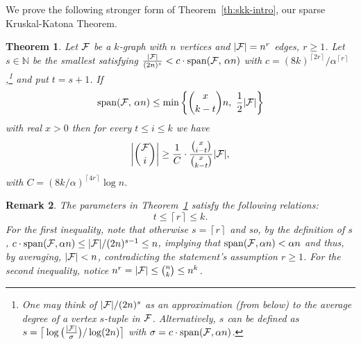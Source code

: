 \documentclass[11pt]{article}
\newtheorem{theo}{Theorem}[section]
\newtheorem{theo}{Theorem}[section]
\newtheorem{remark}[theo]{Remark}
\newcommand{\FF}{{\cal F}}
\newcommand{\ceil}[1]{\left\lceil #1 \right\rceil}
\renewcommand{\wp}{\mathrm{span}}
\renewcommand{\a}{\alpha}
\newcommand{\g}{\gamma}
\newcommand{\N}{\mathbb{N}}
\begin{document}
We prove the following stronger form of Theorem~\ref{th:skk-intro}, our sparse Kruskal-Katona Theorem.

\begin{theo}\label{th:skk}
	Let $\FF$ be a $k$-graph with $n$ vertices and $|\FF|=n^r$ edges, $r \ge 1$. Let $s \in \N$ be the smallest satisfying $\frac{|\FF|}{(2n)^s} < c \cdot \wp(\FF,\, \a n)$ with 
	$c=(8k)^{\ceil{2r}}/\a^{\ceil{r}}$
	,\footnote{One may think of $|\FF|/(2n)^s$ as an approximation (from below) to the average degree of a vertex $s$-tuple in $\FF$. Alternatively, $s$ can be defined as $s=\big\lceil\log\big(\frac{|\FF|}{\sigma}\big)/\log(2n)\big\rceil$ with $\sigma=c \cdot \wp(\FF,\a n)$. 
	} 
	and put $t=s+1$.
	If 
	$$\wp(\FF,\,\a n) \le \min\bigg\{\binom{x}{k-t}n, \,\, \frac{1}{2}|\FF|\bigg\}$$
	with real $x>0$ then for every $t \le i \le k$ we  have 
	$$\bigg|\binom{\FF}{i}\bigg| \ge \frac{1}{C}\cdot \frac{\binom{x}{i-t}}{\binom{x}{k-t}}|\FF|,$$
	with $C = (8k/\a)^{\ceil{4r}} \log n$.
\end{theo}

\begin{remark}
	The parameters in Theorem~\ref{th:skk} satisfy the following relations:
	\begin{equation}\label{eq:sKK-relations}
		t \le \ceil{r} \le k.
	\end{equation}
	For the first inequality, note that otherwise $s=\ceil{r}$ and so, by the definition of $s$, $c \cdot \wp(\FF,\a n) \le |\FF|/(2n)^{s-1} \le n$, implying that $\wp(\FF,\a n) < \a n$ and thus, by averaging, $|\FF| < n$, contradicting the statement's assumption $r \ge 1$. 
	For the second inequality, notice $n^r = |\FF| \le \binom{n}{k} \le n^k$.
\end{remark}
\end{document}
